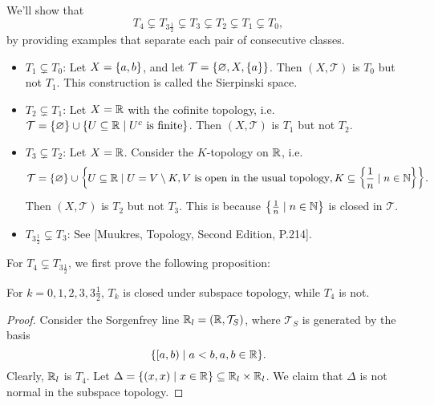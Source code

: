 \begin{ex}
    We'll show that
    \[
    T_4 \subsetneq T_{3\frac 1 2} \subsetneq T_3 \subsetneq T_2 \subsetneq T_1 \subsetneq T_0,
    \]
    by providing examples that separate each pair of consecutive classes.
    \begin{itemize}
        \item $T_1 \subsetneq T_0$: Let $X = {\left\{{a, b}\right\}}$, and let $\mathcal T = {\left\{{\varnothing, X, {\left\{{a}\right\}}}\right\}}$. Then $(X, \mathcal T)$ is $T_0$ but not $T_1$. This construction is called the Sierpinski space.
        \item $T_2 \subsetneq T_1$: Let $X = {\mathbb R}$ with the cofinite topology, i.e. $\mathcal T = {\left\{{\varnothing}\right\}} \cup {\left\{{U\subseteq {\mathbb R}\mid U^c \text{ is finite}}\right\}}$. Then $(X, \mathcal T)$ is $T_1$ but not $T_2$.
        \item $T_3 \subsetneq T_2$: Let $X = {\mathbb R}$. Consider the $K$-topology on ${\mathbb R}$, i.e. 
        \[
        \mathcal T = {\left\{{\varnothing}\right\}} \cup {\left\{{U\subseteq {\mathbb R}\mid U = V\setminus K, V \text{ is open in the usual topology}, K\subseteq {\left\{{\frac1n \mid n\in {\mathbb N}}\right\}}}\right\}}.
        \]
        Then $(X, \mathcal T)$ is $T_2$ but not $T_3$. This is because ${\left\{{\frac1n \mid n\in {\mathbb N}}\right\}}$ is closed in $\mathcal T$.
        \item $T_{3\frac12} \subsetneq T_3$: See [Muukres, Topology, Second Edition, P.214].
    \end{itemize}
    For $T_4 \subsetneq T_{3\frac 1 2}$, we first prove the following proposition:
    \begin{prop}
        For $k = 0, 1, 2, 3, 3\frac12$, $T_k$ is closed under subspace topology, while $T_4$ is not.
        \begin{proof}
            Consider the Sorgenfrey line ${\mathbb R}_l = ({\mathbb R}, \mathcal T_S)$, where $\mathcal T_S$ is generated by the basis
            \[
            {\left\{{[a, b) \mid a < b, a, b\in {\mathbb R}}\right\}}.
            \]
            Clearly, ${\mathbb R}_l$ is $T_4$. Let $\Delta = {\left\{{(x, x) \mid x\in {\mathbb R}}\right\}} \subseteq {\mathbb R}_l \times {\mathbb R}_l$. We claim that $\Delta$ is not normal in the subspace topology.
        \end{proof}
    \end{prop}
\end{ex}

\section{}

